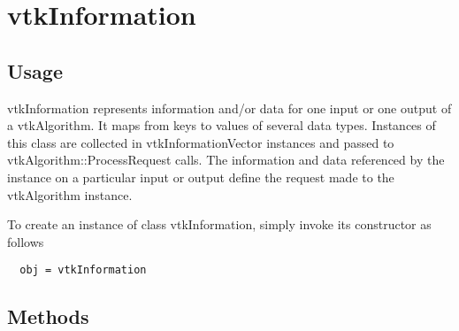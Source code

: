 \section{vtkInformation}

\subsection{Usage}

 vtkInformation represents information and/or data for one input or
 one output of a vtkAlgorithm.  It maps from keys to values of
 several data types.  Instances of this class are collected in
 vtkInformationVector instances and passed to
 vtkAlgorithm::ProcessRequest calls.  The information and
 data referenced by the instance on a particular input or output
 define the request made to the vtkAlgorithm instance.

To create an instance of class vtkInformation, simply
invoke its constructor as follows
\begin{verbatim}
  obj = vtkInformation
\end{verbatim}
\subsection{Methods}

